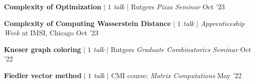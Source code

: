 \resumeProjectHeading
{\textbf{Complexity of Optimization} $|$ \emph{$1$ talk} $|$ Rutgers \textit{Pizza Seminar}}
{Oct '23}
{}
\vspace{\mygap}

\resumeProjectHeading
{\textbf{Complexity of Computing Wasserstein Distance} $|$ \emph{$1$ talk} $|$ \textit{Apprenticeship Week} at IMSI, Chicago }
{Oct '23}
{}
\vspace{\mygap}



%
%
%

\resumeProjectHeading
{\textbf{Kneser graph coloring} $|$ \emph{$1$ talk} $|$ Rutgers \textit{Graduate Combinatorics Seminar}}
{Oct '22}
{}
\vspace{\mygap}




\resumeProjectHeading
{\textbf{Fiedler vector method} $|$ \emph{$1$ talk} $|$ CMI course: \textit{Matrix Computations}}
{May '22}
{}
\vspace{\mygap}

%

